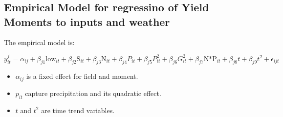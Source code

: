 \documentclass[
  letterpaper,
  DIV=11,
  numbers=noendperiod]{scrartcl}
\providecommand{\tightlist}{%
  \setlength{\itemsep}{0pt}\setlength{\parskip}{0pt}}\usepackage{longtable,booktabs,array}
\begin{document}
\subsection{Empirical Model for regressino of Yield Moments to inputs
and
weather}\label{empirical-model-for-regressino-of-yield-moments-to-inputs-and-weather}

The empirical model is:

\[
y_{it}^j = \alpha_{ij} + \beta_{j1} \text{low}_{it} + \beta_{j2} \text{S}_{it} + \beta_{j3} \text{N}_{it} + \beta_{j4} P_{it} + \beta_{j5} P^2_{it}+ \beta_{j6} G_{it}^2 + \beta_{j7} \text{N*P}_{it} +
\beta_{j8} t + \beta_{j9} t^2 + \epsilon_{ijt}
\]

\begin{itemize}
\tightlist
\item
  \(\alpha_{ij}\) is a fixed effect for field and moment.
\item
  \(p_{it}\) capture precipitation and its quadratic effect.
\item
  \(t\) and \(t^2\) are time trend variables.
\end{itemize}
\end{document}
